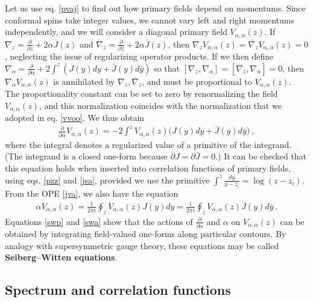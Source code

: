 \documentclass[12pt, a4paper, notitlepage, twoside]{report}
\numberwithin{equation}{section}
\theoremstyle{break}
\begin{document}
Let us use eq. \eqref{pvaj} to find out how primary fields depend on momentums. 
Since conformal spins take integer values, we cannot vary left and right momentums independently, and we will consider a diagonal primary field $V_{\alpha,\alpha}(z)$. 
If $\nabla_z={\frac{\partial}{\partial z}} +2\alpha J(z)$ and $\overline{\nabla}_{z}={\frac{\partial}{\partial \bar z}} +2\alpha \bar J(z)$, then $\nabla_z V_{\alpha,\alpha}(z)=\overline{\nabla}_z V_{\alpha,\alpha}(z)=0$, neglecting the issue of regularizing operator products.
If we then define $\nabla_\alpha = {\frac{\partial}{\partial \alpha}}+2\int^z (J(y)dy +\bar J(y)d\bar y)$ so that $[\nabla_z,\nabla_\alpha]=[\overline{\nabla}_z,\nabla_\alpha]=0$, then $\nabla_\alpha V_{\alpha,\alpha}(z)$ is annihilated by $\nabla_z,\overline{\nabla}_z$, and must be proportional to $V_{\alpha,\alpha}(z)$.
The proportionality constant can be set to zero by renormalizing the field $V_{\alpha,\alpha}(z)$, and this normalization coincides with the normalization that we adopted in eq. \eqref{vvoo}.
We thus obtain
\begin{align}
 {\frac{\partial}{\partial \alpha}} V_{\alpha,\alpha}(z) 
 = -2 \int^z V_{\alpha,\alpha}(z)\Big(J(y)dy+\bar J(y)d\bar y \Big)\ ,
\label{swp}
\end{align}
where the integral denotes a regularized value of a primitive of the integrand. (The integrand is a closed one-form because $\bar\partial J = \partial \bar J=0$.)
It can be checked that this equation holds when inserted into correlation functions of primary fields, using eqs. \eqref{pzz} and \eqref{jsa}, provided we use the primitive $\int^z \frac{dy}{y-z_i} = \log(z-z_i)$.
From the OPE \eqref{jva}, we also have the equation
\begin{align}
 \alpha V_{\alpha,\alpha}(z) 
 = \frac{1}{2\pi i} \oint_{z} V_{\alpha,\alpha}(z)J(y)dy
 = \frac{1}{2\pi i} \oint_{z} V_{\alpha,\alpha}(z)\bar J(y)d\bar y\ .
\label{swa}
\end{align}
Equations \eqref{swp} and \eqref{swa} show that the actions of ${\frac{\partial}{\partial \alpha}}$ and $\alpha$ on $V_{\alpha,\alpha}(z)$ can be obtained by integrating field-valued one-forms along particular contours.
By analogy with supersymmetric gauge theory, these equations may be called \textbf{\boldmath Seiberg--Witten equations}. 


\subsection{Spectrum and correlation functions \label{secsacf}}
\end{document}
